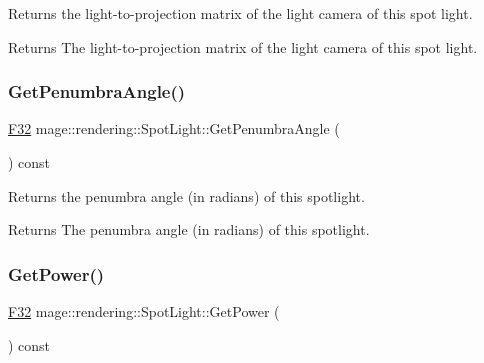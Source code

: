 Returns the light-\/to-\/projection matrix of the light camera of this spot light.

\begin{DoxyReturn}{Returns}
The light-\/to-\/projection matrix of the light camera of this spot light. 
\end{DoxyReturn}
\mbox{\label{classmage_1_1rendering_1_1_spot_light_a17d63e6f944d83eaca821476de70d5bc}} 
\subsubsection{\texorpdfstring{Get\+Penumbra\+Angle()}{GetPenumbraAngle()}}
{\footnotesize\ttfamily \mbox{\hyperlink{namespacemage_aa97e833b45f06d60a0a9c4fc22ae02c0}{F32}} mage\+::rendering\+::\+Spot\+Light\+::\+Get\+Penumbra\+Angle (\begin{DoxyParamCaption}{ }\end{DoxyParamCaption}) const\hspace{0.3cm}{\ttfamily [noexcept]}}

Returns the penumbra angle (in radians) of this spotlight.

\begin{DoxyReturn}{Returns}
The penumbra angle (in radians) of this spotlight. 
\end{DoxyReturn}
\mbox{\label{classmage_1_1rendering_1_1_spot_light_a835e4624ec959374b099dd07c7398929}} 
\subsubsection{\texorpdfstring{Get\+Power()}{GetPower()}}
{\footnotesize\ttfamily \mbox{\hyperlink{namespacemage_aa97e833b45f06d60a0a9c4fc22ae02c0}{F32}} mage\+::rendering\+::\+Spot\+Light\+::\+Get\+Power (\begin{DoxyParamCaption}{ }\end{DoxyParamCaption}) const\hspace{0.3cm}{\ttfamily [noexcept]}}

